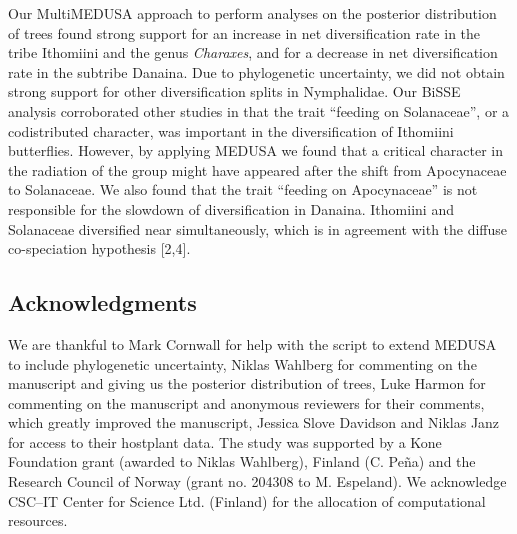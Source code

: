 \documentclass[10pt]{article}
\begin{document}
Our MultiMEDUSA approach to perform analyses on the posterior
distribution of trees found strong support for an increase in net
diversification rate in the tribe Ithomiini and the genus
\emph{Charaxes}, and for a decrease in net diversification rate in the
subtribe Danaina. Due to phylogenetic uncertainty, we did not obtain
strong support for other diversification splits in Nymphalidae. Our
BiSSE analysis corroborated other studies in that the trait 
``feeding on Solanaceae'', or a codistributed character, was important in the
diversification of Ithomiini butterflies. However, by applying MEDUSA we
found that a critical character in the radiation of the group might have
appeared after the shift from Apocynaceae to Solanaceae. We also found
that the trait ``feeding on Apocynaceae'' is not responsible for the
slowdown of diversification in Danaina. Ithomiini and Solanaceae
diversified near simultaneously, which is in agreement with the diffuse
co-speciation hypothesis {[}2,4{]}.

\subsection*{Acknowledgments}
We are thankful to Mark Cornwall for help with the script to extend
MEDUSA to include phylogenetic uncertainty, Niklas Wahlberg for
commenting on the manuscript and giving us the posterior distribution of
trees, Luke Harmon for commenting on the manuscript and anonymous
reviewers for their comments, which greatly improved the manuscript,
Jessica Slove Davidson and Niklas Janz for access to their hostplant
data. The study was supported by a Kone Foundation grant (awarded to
Niklas Wahlberg), Finland (C. Pe\~na) and the Research Council of Norway
(grant no. 204308 to M. Espeland). We acknowledge CSC--IT Center for
Science Ltd. (Finland) for the allocation of computational resources.
\end{document}
